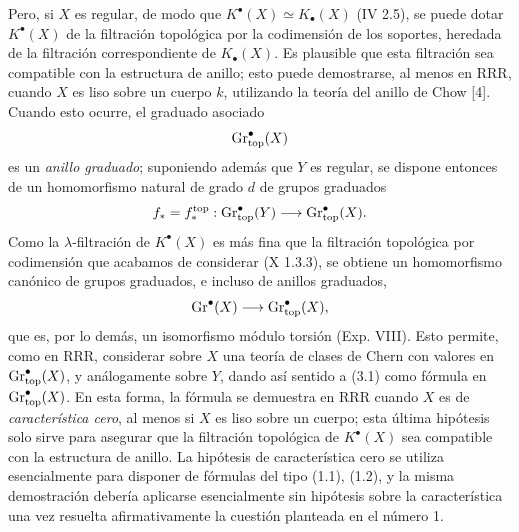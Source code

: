 Pero, si $X$ es regular, de modo que
$K^\bullet(X)\simeq K_\bullet(X)$ (IV 2.5), se puede dotar
$K^\bullet(X)$ de la filtración topológica por la codimensión de los
soportes, heredada de la filtración correspondiente de $K_\bullet(X)$. Es
plausible que esta filtración sea compatible con la estructura de anillo;
esto puede demostrarse, al menos en RRR, cuando $X$ es liso sobre un cuerpo
$k$, utilizando la teoría del anillo de Chow [4]. Cuando esto ocurre, el
graduado asociado
\[
\operatorname{Gr}_{\mathrm{top}}^\bullet(X)
\]
es un \emph{anillo graduado}; suponiendo además que $Y$ es regular, se dispone
entonces de un homomorfismo natural de grado $d$ de grupos graduados
\[
f_*=f_*^{\mathrm{top}}:\operatorname{Gr}_{\mathrm{top}}^\bullet(Y)\longrightarrow
\operatorname{Gr}_{\mathrm{top}}^\bullet(X).
\]
Como la $\lambda$-filtración de $K^\bullet(X)$ es más fina que la filtración
topológica por codimensión que acabamos de considerar (X 1.3.3), se obtiene
un homomorfismo canónico de grupos graduados, e incluso de anillos graduados,
\[
\operatorname{Gr}^\bullet(X)\longrightarrow\operatorname{Gr}_{\mathrm{top}}^\bullet(X),
\]
que es, por lo demás, un isomorfismo módulo torsión (Exp. VIII). Esto permite,
como en RRR, considerar sobre $X$ una teoría de clases de Chern con valores
en $\operatorname{Gr}_{\mathrm{top}}^\bullet(X)$, y análogamente sobre $Y$, dando así sentido a (3.1)
como fórmula en $\operatorname{Gr}_{\mathrm{top}}^\bullet(X)$. En esta forma, la fórmula se demuestra
en RRR cuando $X$ es de \emph{característica cero}, al menos si $X$ es liso
sobre un cuerpo; esta última hipótesis solo sirve para asegurar que la
filtración topológica de $K^\bullet(X)$ sea compatible con la estructura de
anillo. La hipótesis de característica cero se utiliza esencialmente para
disponer de fórmulas del tipo (1.1), (1.2), y la misma demostración debería
aplicarse esencialmente sin hipótesis sobre la característica una vez
resuelta afirmativamente la cuestión planteada en el número 1.

